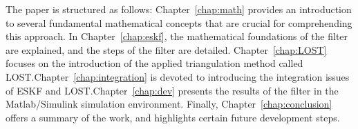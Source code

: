 The paper is structured as follows: Chapter~\ref{chap:math} provides an introduction to several fundamental mathematical concepts that are crucial for comprehending this approach. In Chapter~\ref{chap:eskf}, the mathematical foundations of the filter are explained, and the steps of the filter are detailed. Chapter~\ref{chap:LOST} focuses on the introduction of the applied triangulation method called LOST.\@ Chapter~\ref{chap:integration} is devoted to introducing the integration issues of ESKF and LOST.\@ Chapter~\ref{chap:dev} presents the results of the filter in the Matlab/Simulink simulation environment. Finally, Chapter~\ref{chap:conclusion} offers a summary of the work, and highlights certain future development steps.